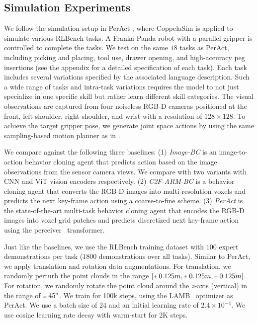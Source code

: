 
\subsection{Simulation Experiments} 
\label{sec:exp_sim}

We follow the simulation setup in PerAct \cite{peract2022arxiv}, where CoppelaSim \cite{rohmer2013v} is applied to simulate various RLBench \cite{james2020rlbench} tasks. A Franka Panda robot with a parallel gripper is controlled to complete the tasks. We test on the same $18$ tasks as PerAct, including picking and placing, tool use, drawer opening, and high-accuracy peg insertions (see the appendix for a detailed specification of each task). Each task includes several variations specified by the associated language description. Such a wide range of tasks and intra-task variations requires the model to not just specialize in one specific skill but rather learn different skill categories. The visual observations are captured from four noiseless RGB-D cameras positioned at the front, left shoulder, right shoulder, and wrist with a resolution of $128\times128$. To achieve the target gripper pose, we generate joint space actions by using the same sampling-based motion planner \cite{sanchez2001single, sucan2012open} as in \cite{c2farm, peract2022arxiv}.

We compare against the following three baselines: (1) \textit{Image-BC} \cite{jang2021bcz} is an image-to-action behavior cloning agent that predicts action based on the image observations from the sensor camera views. We compare with two variants with CNN and ViT vision encoders respectively. (2) \textit{C2F-ARM-BC} \cite{c2farm} is a behavior cloning agent that converts the RGB-D images into multi-resolution voxels and predicts the next key-frame action using a coarse-to-fine scheme. (3) \textit{PerAct} \cite{peract2022arxiv} is the state-of-the-art multi-task behavior cloning agent that encodes the RGB-D images into voxel grid patches and predicts discretized next key-frame action using the perceiver~\cite{jaegle2021perceiver} transformer.

Just like the baselines, we use the RLBench training dataset with $100$ expert demonstrations per task ($1800$ demonstrations over all tasks). Similar to PerAct, we apply translation and rotation data augmentations. For translation, we randomly perturb the point clouds in the range $\left[\rpm 0.125 m, \rpm 0.125 m, \rpm 0.125 m\right]$. For rotation, we randomly rotate the point cloud around the $z$-axis (vertical) in the range of $\rpm45^{\circ}$. We train \method for 100k steps, using the LAMB~\cite{you2019large} optimizer as PerAct. We use a batch size of 24 and an initial learning rate of $2.4\times10^{-4}$. We use cosine learning rate decay with warm-start for 2K steps.

